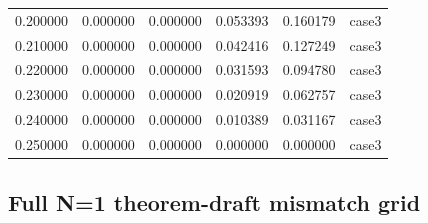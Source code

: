 \documentclass[a4paper,twocolumn,11pt,unpublished]{quantumarticle}
\begin{document}
\begin{table}[t]
\begin{tabular}{cccccc}
0.200000 & 0.000000 & 0.000000 & 0.053393 & 0.160179 & case3 \\
0.210000 & 0.000000 & 0.000000 & 0.042416 & 0.127249 & case3 \\
0.220000 & 0.000000 & 0.000000 & 0.031593 & 0.094780 & case3 \\
0.230000 & 0.000000 & 0.000000 & 0.020919 & 0.062757 & case3 \\
0.240000 & 0.000000 & 0.000000 & 0.010389 & 0.031167 & case3 \\
0.250000 & 0.000000 & 0.000000 & 0.000000 & 0.000000 & case3 \\
\hline
\end{tabular}
\end{table}

\subsection{Full N=1 theorem-draft mismatch grid}
\end{document}
